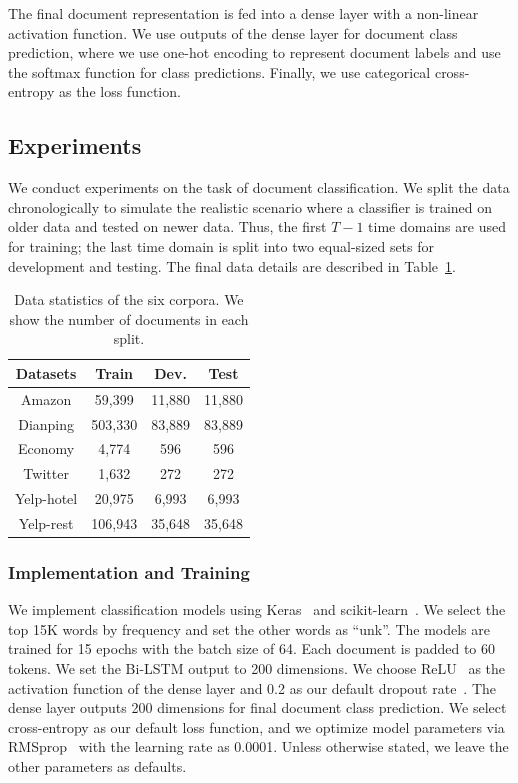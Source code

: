 The final document representation is fed into a dense layer with a non-linear activation function. We use outputs of the dense layer for document class prediction,
where we use one-hot encoding to represent document labels and use the softmax function for class predictions. Finally, we use categorical cross-entropy as the loss function.



\subsection{Experiments}
\label{chap3:sec:dweExp}

We conduct experiments on the task of document classification.
We split the data chronologically to simulate the realistic scenario where a classifier is trained on older data and tested on newer data. 
Thus, the first $T-1$ time domains are used for training;
the last time domain is split into two equal-sized sets for development and testing.
The final data details are described in Table~\ref{chap3:table:statics}.

\begin{table}[ht]
 \centering
    \begin{tabular}{c|ccc}
    \hline\hline
    Datasets & Train & Dev. & Test\\
    \hline
    Amazon & 59,399 & 11,880 & 11,880 \\
    Dianping & 503,330 & 83,889 & 83,889 \\
    Economy & 4,774 & 596 & 596\\
    Twitter & 1,632 & 272 & 272\\
    Yelp-hotel & 20,975 & 6,993 & 6,993 \\
    Yelp-rest & 106,943 & 35,648 & 35,648 \\
    \hline
    \end{tabular}
    \caption{Data statistics of the six corpora. We show the number of documents in each split.}
    \label{chap3:table:statics}
\end{table}


\subsubsection{Implementation and Training}
We implement classification models using Keras~\cite{chollet2015keras} and scikit-learn~\cite{pedregosa2011scikit}. We select the top 15K words by frequency and set the other words as ``unk''. The models are trained for 15 epochs with the batch size of 64. Each document is padded to 60 tokens. We set the Bi-LSTM output to 200 dimensions. We choose ReLU~\cite{hahnloser2000digital} as the activation function of the dense layer and 0.2 as our default dropout rate~\cite{srivastava2014dropout}. The dense layer outputs 200 dimensions for final document class prediction. We select cross-entropy as our default loss function, and we optimize model parameters via RMSprop~\cite{tieleman2012lecture} with the learning rate as 0.0001. Unless otherwise stated, we leave the other parameters as defaults.


